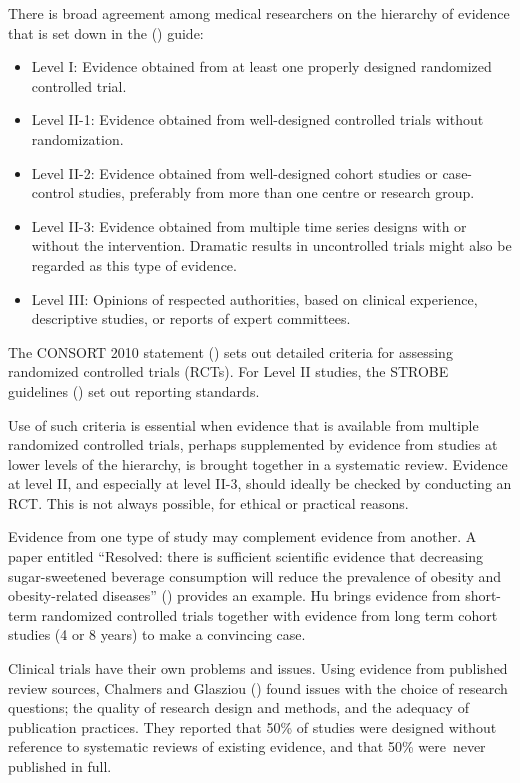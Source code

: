 \documentclass[
  10ptls,
  b5paper]{book}
\providecommand{\tightlist}{%
  \setlength{\itemsep}{0pt}\setlength{\parskip}{0pt}}
\begin{document}
There is broad agreement among medical researchers on the hierarchy of evidence that is set down in the () guide:

\begin{itemize}
\tightlist
\item
  Level I: Evidence obtained from at least one properly designed randomized controlled trial.
\item
  Level II-1: Evidence obtained from well-designed controlled trials without randomization.
\item
  Level II-2: Evidence obtained from well-designed cohort studies or case-control studies, preferably from more than one centre or research group.
\item
  Level II-3: Evidence obtained from multiple time series designs with or without the intervention. Dramatic results in uncontrolled trials might also be regarded as this type of evidence.
\item
  Level III: Opinions of respected authorities, based on clinical experience, descriptive studies, or reports of expert committees.
\end{itemize}

The CONSORT 2010 statement () sets out detailed criteria for assessing randomized controlled trials (RCTs). For Level II studies, the STROBE guidelines () set out reporting standards.

Use of such criteria is essential when evidence that is available from multiple randomized controlled trials, perhaps supplemented by evidence from studies at lower levels of the hierarchy, is brought together in a systematic review. Evidence at level II, and especially at level II-3, should ideally be checked by conducting an RCT. This is not always possible, for ethical or practical reasons.

Evidence from one type of study may complement evidence from another. A paper entitled ``Resolved: there is sufficient scientific evidence that decreasing sugar-sweetened beverage consumption will reduce the prevalence of obesity and obesity-related diseases'' () provides an example. Hu brings evidence from short-term randomized controlled trials together with evidence from long term cohort studies (4 or 8 years) to make a convincing case.

Clinical trials have their own problems and issues. Using evidence from published review sources, Chalmers and Glasziou () found issues with the choice of research questions; the quality of research design and methods, and the adequacy of publication practices. They reported that 50\% of studies were designed without reference to systematic reviews of existing evidence, and that 50\% were~never published in full.
\end{document}
